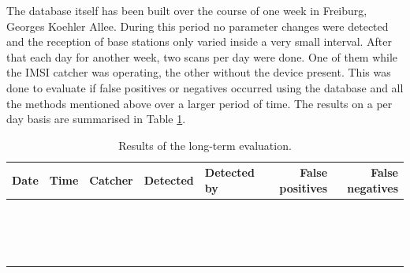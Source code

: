 The database itself has been built over the course of one week in Freiburg, Georges Koehler Allee.
During this period no parameter changes were detected and the reception of base stations only varied inside a very small interval.
After that each day for another week, two scans per day were done.
One of them while the IMSI catcher was operating, the other without the device present.
This was done to evaluate if false positives or negatives occurred using the database and all the methods mentioned above over a larger period of time.
The results on a per day basis are summarised in Table \ref{tab:longterm_test}.
\begin{table}
\centering
\begin{tabular}{lllllrr}
\toprule
Date	&Time	&Catcher	&Detected	&Detected by	&False positives	&False negatives\\
\midrule
		&		&			&			&				&					&				\\
		&		&			&			&				&					&				\\
		&		&			&			&				&					&				\\
		&		&			&			&				&					&				\\
		&		&			&			&				&					&				\\
		&		&			&			&				&					&				\\
		&		&			&			&				&					&				\\
		&		&			&			&				&					&				\\
		&		&			&			&				&					&				\\
		&		&			&			&				&					&				\\
		&		&			&			&				&					&				\\
		&		&			&			&				&					&				\\
		&		&			&			&				&					&				\\
		&		&			&			&				&					&				\\
		&		&			&			&				&					&				\\
		&		&			&			&				&					&				\\
\bottomrule
\end{tabular}
\caption{Results of the long-term evaluation.}
\label{tab:longterm_test}
\end{table}

